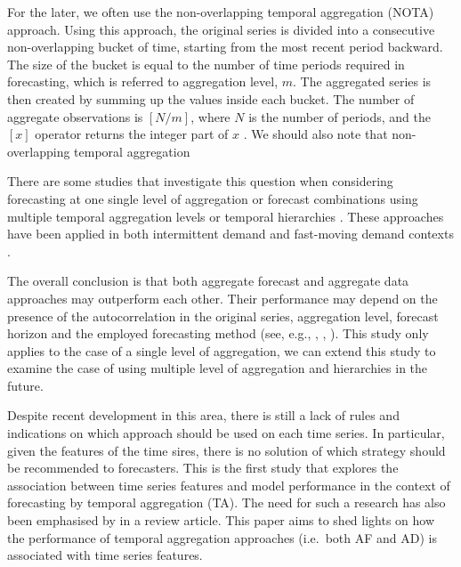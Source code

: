 \documentclass[preprint, 3p,
authoryear]{elsarticle} %
\begin{document}
For the later, we often use the non-overlapping temporal aggregation
(NOTA) approach. Using this approach, the original series is divided
into a consecutive non-overlapping bucket of time, starting from the
most recent period backward. The size of the bucket is equal to the
number of time periods required in forecasting, which is referred to
aggregation level, \(m\). The aggregated series is then created by
summing up the values inside each bucket. The number of aggregate
observations is \([N/m]\), where \(N\) is the number of periods, and the
\([x]\) operator returns the integer part of \(x\)
\citep{rostami2019impact}. We should also note that non-overlapping
temporal aggregation

There are some studies that investigate this question when considering
forecasting at one single level of aggregation
\citep[\citet{rostami2014note},
\citet{kourentzes2017demand}]{rostami2013demand} or forecast
combinations using multiple temporal aggregation levels
\citep{kourentzes2014improving} or temporal hierarchies
\citep{athanasopoulos2017forecasting}. These approaches have been
applied
\citep[\citet{petropoulos2014forecast}]{nikolopoulos2011aggregate} in
both intermittent demand \citep{nikolopoulos2021we} and fast-moving
demand contexts \citep{athanasopoulos2017forecasting}.

The overall conclusion is that both aggregate forecast and aggregate
data approaches may outperform each other. Their performance may depend
on the presence of the autocorrelation in the original series,
aggregation level, forecast horizon and the employed forecasting method
(see, e.g., \citet{boylan2016performance}, \citet{rostami2021aggregate},
\citet{rostami2014note} \citet{nikolopoulos2011aggregate}). This study
only applies to the case of a single level of aggregation, we can extend
this study to examine the case of using multiple level of aggregation
and hierarchies in the future.

Despite recent development in this area, there is still a lack of rules
and indications on which approach should be used on each time series. In
particular, given the features of the time sires, there is no solution
of which strategy should be recommended to forecasters. This is the
first study that explores the association between time series features
and model performance in the context of forecasting by temporal
aggregation (TA). The need for such a research has also been emphasised
by \citet{babai2021demand} in a review article. This paper aims to shed
lights on how the performance of temporal aggregation approaches
(i.e.~both AF and AD) is associated with time series features.
\end{document}

